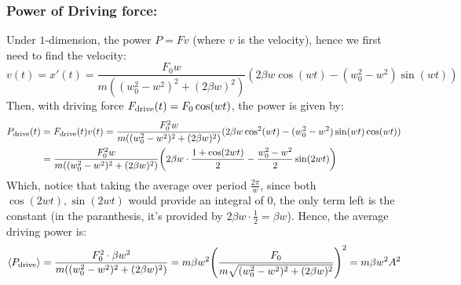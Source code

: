 \documentclass{article}
\DeclarePairedDelimiter{\paran}{(}{)}%
\DeclarePairedDelimiter{\bracket}{\langle}{\rangle}
\begin{document}
\subsubsection*{Power of Driving force:}
Under $1$-dimension, the power $P = Fv$ (where $v$ is the velocity), hence we first need to find the velocity:
\begin{equation}
    v(t)=x'(t) = \frac{F_0w}{m((w_0^2-w^2)^2+(2\beta w)^2)}(2\beta w\cos(wt)-(w_0^2-w^2)\sin(wt))
\end{equation}
Then, with driving force $F_{\textmd{drive}}(t)=F_0\cos(wt)$, the power is given by:
\begin{align}
    P_{\textmd{drive}}(t)&=F_{\textmd{drive}}(t)v(t) = \frac{F_0^2w}{m((w_0^2-w^2)^2+(2\beta w)^2)}(2\beta w\cos^2(wt)-(w_0^2-w^2)\sin(wt)\cos(wt))\\
    &=\frac{F_0^2w}{m((w_0^2-w^2)^2+(2\beta w)^2)}\paran*{2\beta w\cdot\frac{1+\cos(2wt)}{2}-\frac{w_0^2-w^2}{2}\sin(2wt)}
\end{align}
Which, notice that taking the average over period $\frac{2\pi}{w}$, since both $\cos(2wt),\sin(2wt)$ would provide an integral of $0$, the only term left is the constant (in the paranthesis, it's provided by $2\beta w \cdot \frac{1}{2}=\beta w$). Hence, the average driving power is:
\begin{equation}
    \bracket*{P_{\textmd{drive}}} = \frac{F_0^2\cdot\beta w^2}{m((w_0^2-w^2)^2+(2\beta w)^2)} = m\beta w^2\paran*{\frac{F_0}{m\sqrt{(w_0^2-w^2)^2+(2\beta w)^2}}}^2 = m\beta w^2A^2
\end{equation}
\end{document}
